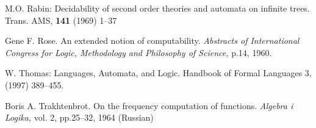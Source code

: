 \documentclass{llncs}
\begin{document}
\begin{thebibliography}{99}
M.O. Rabin: 
Decidability of second order theories and automata on infinite trees.
Trans. AMS, {\bf 141} (1969) 1--37
%

Gene F. Rose.
An extended notion of computability.
{\em Abstracts of International Congress for Logic, Methodology and Philosophy of Science,} p.14, 1960.

W. Thomas: 
Languages, Automata, and Logic. 
Handbook of Formal Languages 3, (1997) 389--455.

Boris A. Trakhtenbrot.
On the frequency computation of functions.
{\em Algebra i Logika,} vol. 2, pp.25--32, 1964 (Russian)


\end{thebibliography}
\end{document}
